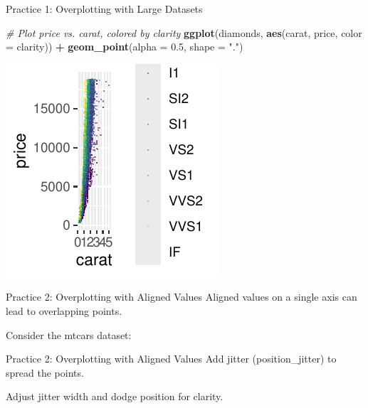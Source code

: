 \documentclass[
  ignorenonframetext,
]{beamer}
\newenvironment{Shaded}{\begin{snugshade}}{\end{snugshade}}
\newcommand{\AttributeTok}[1]{\textcolor[rgb]{0.13,0.29,0.53}{#1}}
\newcommand{\CommentTok}[1]{\textcolor[rgb]{0.56,0.35,0.01}{\textit{#1}}}
\newcommand{\FloatTok}[1]{\textcolor[rgb]{0.00,0.00,0.81}{#1}}
\newcommand{\FunctionTok}[1]{\textcolor[rgb]{0.13,0.29,0.53}{\textbf{#1}}}
\newcommand{\NormalTok}[1]{#1}
\newcommand{\SpecialCharTok}[1]{\textcolor[rgb]{0.81,0.36,0.00}{\textbf{#1}}}
\newcommand{\StringTok}[1]{\textcolor[rgb]{0.31,0.60,0.02}{#1}}
\begin{document}
\begin{frame}[fragile]{Practice 1: Overplotting with Large Datasets}
\label{practice-1-overplotting-with-large-datasets-1}

\begin{Shaded}
\begin{Highlighting}[]
\CommentTok{\# Plot price vs. carat, colored by clarity}
\FunctionTok{ggplot}\NormalTok{(diamonds, }\FunctionTok{aes}\NormalTok{(carat, price, }\AttributeTok{color =}\NormalTok{ clarity)) }\SpecialCharTok{+} \FunctionTok{geom\_point}\NormalTok{(}\AttributeTok{alpha =} \FloatTok{0.5}\NormalTok{,}
    \AttributeTok{shape =} \StringTok{"."}\NormalTok{)}
\end{Highlighting}
\end{Shaded}

\begin{center}\includegraphics[width=0.5\linewidth]{Figs/unnamed-chunk-33-1} \end{center}
\end{frame}

\begin{frame}{Practice 2: Overplotting with Aligned Values}
\label{practice-2-overplotting-with-aligned-values}
Aligned values on a single axis can lead to overlapping points.

Consider the mtcars dataset:
\end{frame}

\begin{frame}{Practice 2: Overplotting with Aligned Values}
\label{practice-2-overplotting-with-aligned-values-1}
Add jitter (position\_jitter) to spread the points.

Adjust jitter width and dodge position for clarity.
\end{frame}
\end{document}
